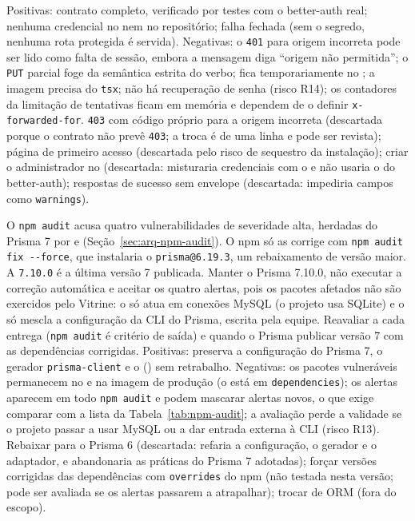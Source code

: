 {Positivas: contrato completo, verificado por testes com o better-auth real; nenhuma credencial no  nem no repositório; falha fechada (sem o segredo, nenhuma rota protegida é servida). Negativas: o \texttt{401} para origem incorreta pode ser lido como falta de sessão, embora a mensagem diga ``origem não permitida''; o \texttt{PUT} parcial foge da semântica estrita do verbo;  fica temporariamente no ; a imagem precisa do \texttt{tsx}; não há recuperação de senha (risco R14); os contadores da limitação de tentativas ficam em memória e dependem de o  definir \texttt{x-forwarded-for}.}
{\texttt{403} com código próprio para a origem incorreta (descartada porque o contrato não prevê \texttt{403}; a troca é de uma linha e pode ser revista); página de primeiro acesso (descartada pelo risco de sequestro da instalação); criar o administrador no  (descartada: misturaria credenciais com o  e não usaria o  do better-auth); respostas de sucesso sem envelope (descartada: impediria campos como \texttt{warnings}).}

{O \texttt{npm audit} acusa quatro vulnerabilidades de severidade alta, herdadas do Prisma 7 por  e  (Seção~\ref{sec:arq-npm-audit}). O npm só as corrige com \texttt{npm audit fix -{}-force}, que instalaria o \texttt{prisma@6.19.3}, um rebaixamento de versão maior. A \texttt{7.10.0} é a última versão 7 publicada.}
{Manter o Prisma 7.10.0, não executar a correção automática e aceitar os quatro alertas, pois os pacotes afetados não são exercidos pelo Vitrine: o  só atua em conexões MySQL (o projeto usa SQLite) e o  só mescla a configuração da CLI do Prisma, escrita pela equipe. Reavaliar a cada entrega (\texttt{npm audit} é critério de saída) e quando o Prisma publicar versão 7 com as dependências corrigidas.}
{Positivas: preserva a configuração do Prisma 7, o gerador \texttt{prisma-client} e o  () sem retrabalho. Negativas: os pacotes vulneráveis permanecem no  e na imagem de produção (o  está em \texttt{dependencies}); os alertas aparecem em todo \texttt{npm audit} e podem mascarar alertas novos, o que exige comparar com a lista da Tabela~\ref{tab:npm-audit}; a avaliação perde a validade se o projeto passar a usar MySQL ou a dar entrada externa à CLI (risco R13).}
{Rebaixar para o Prisma 6 (descartada: refaria a configuração, o gerador e o adaptador, e abandonaria as práticas do Prisma 7 adotadas); forçar versões corrigidas das dependências com \texttt{overrides} do npm (não testada nesta versão; pode ser avaliada se os alertas passarem a atrapalhar); trocar de ORM (fora do escopo).}

